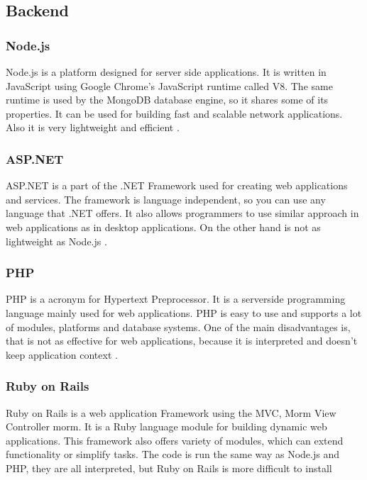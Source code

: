 \subsection{Backend}
\subsubsection*{Node.js}
Node.js is a platform designed for server side applications. It is written in JavaScript using Google Chrome's JavaScript runtime called V8. The same runtime is used by the MongoDB database engine, so it shares some of its properties. It can be used for building fast and scalable network applications. Also it is very lightweight and efficient \cite{nodejs-about}.

\subsubsection*{ASP.NET}
ASP.NET is a part of the .NET Framework used for creating web applications and
services. The framework is language independent, so you can use any language
that .NET offers. It also allows programmers to use similar approach in web
applications as in desktop applications. On the other hand is not as lightweight as Node.js \cite{aspnet-about, palermo2010asp.net}.

\subsubsection*{PHP}
PHP is a acronym for Hypertext Preprocessor. It is a serverside programming language mainly used for web applications. PHP is easy to use and supports a lot of modules, platforms and database systems. One of the main disadvantages is, that is not as effective for web applications, because it is interpreted and doesn't keep application context \cite{php-whatis}.

\subsubsection*{Ruby on Rails}
Ruby on Rails is a web application Framework using the MVC, Morm View Controller morm. It is a Ruby language module for building dynamic web applications. This framework also offers variety of modules, which can extend functionality or simplify tasks. The code is run the same way as Node.js and PHP, they are all interpreted, but Ruby on Rails is more difficult to install \cite{ror-about}

